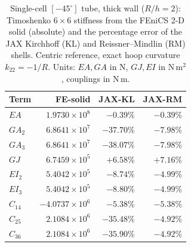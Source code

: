 \begin{table}[t]
\centering
\caption{Single-cell $[-45^\circ]$ tube, thick wall ($R/h = 2$): Timoshenko $6\times6$ stiffness from the FEniCS 2-D solid (absolute) and the percentage error of the JAX Kirchhoff (KL) and Reissner--Mindlin (RM) shells. Centric reference, exact hoop curvature $k_{22}=-1/R$. Units: $EA,GA$ in N, $GJ,EI$ in N\,m$^2$, couplings in N\,m.}
\label{tab:aniso_tube_thick}
\renewcommand{\arraystretch}{1.4}\setlength{\tabcolsep}{10pt}
\begin{tabular}{lrrr}
\toprule
Term & FE-solid & JAX-KL & JAX-RM \\
\midrule
$EA$ & $1.9730{\times}10^{8}$ & $-0.39\%$ & $-0.39\%$ \\
$GA_2$ & $6.8641{\times}10^{7}$ & $-37.70\%$ & $-7.98\%$ \\
$GA_3$ & $6.8641{\times}10^{7}$ & $-38.07\%$ & $-7.98\%$ \\
$GJ$ & $6.7459{\times}10^{5}$ & $+6.58\%$ & $+7.16\%$ \\
$EI_2$ & $5.4042{\times}10^{5}$ & $-8.74\%$ & $-4.99\%$ \\
$EI_3$ & $5.4042{\times}10^{5}$ & $-8.80\%$ & $-4.99\%$ \\
$C_{14}$ & $-4.0737{\times}10^{6}$ & $-5.38\%$ & $-5.38\%$ \\
$C_{25}$ & $2.1084{\times}10^{6}$ & $-35.48\%$ & $-4.92\%$ \\
$C_{36}$ & $2.1084{\times}10^{6}$ & $-35.90\%$ & $-4.92\%$ \\
\bottomrule
\end{tabular}
\end{table}
